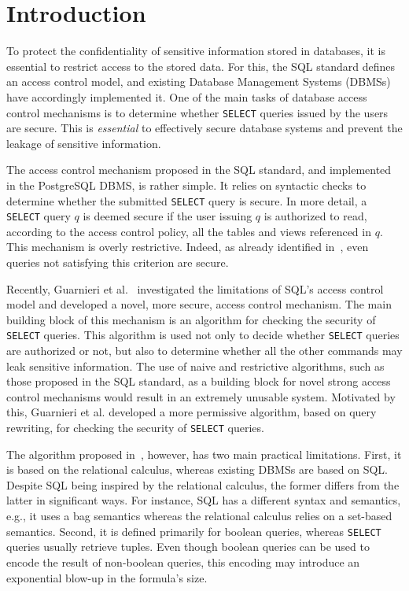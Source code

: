 \section{Introduction}
To protect the confidentiality of sensitive information stored in databases, it is essential to restrict access to the stored data.
%
For this, the SQL standard defines an access control model, and existing Database Management Systems (DBMSs) have accordingly implemented it. 
%
One of the main tasks of database access control mechanisms is to determine whether \texttt{SELECT} queries issued by the users are secure.
%
This is \emph{essential} to effectively secure database systems and prevent the leakage of sensitive information.

The access control mechanism proposed in the SQL standard, and implemented in the PostgreSQL DBMS, is rather simple.
%
It relies on syntactic checks to determine whether the submitted \texttt{SELECT} query is secure.
%
In more detail, a \texttt{SELECT} query $q$ is deemed secure if the user issuing $q$ is authorized to read, according to the access control policy, all the tables and views referenced in $q$. %
%
This mechanism is overly restrictive.
%
Indeed, as already identified in~\cite{guarnieri2014optimal,rizvi2004extending, wang2007correctness,zhang2005authorizations}, even queries not satisfying this criterion are secure.

Recently, Guarnieri et al.~\cite{guarnieri2016strong} investigated the limitations of SQL's access control model and  developed a novel, more secure, access control mechanism.
%
The main building block of this mechanism is an algorithm for checking the security of \texttt{SELECT} queries.
%
This algorithm is used not only to decide whether \texttt{SELECT} queries are authorized or not, but also to determine whether all the other commands may leak sensitive information. 
%
The use of naive and restrictive algorithms, such as those proposed in the SQL standard, as a building block for novel strong access control mechanisms would result in an extremely unusable system.
%
Motivated by this, Guarnieri et al. developed a more permissive algorithm, based on query rewriting, for checking the security of \texttt{SELECT} queries.

The algorithm proposed in~\cite{guarnieri2016strong}, however, has two main practical limitations.
%
First, it is based on the relational calculus, whereas existing DBMSs are based on SQL. Despite SQL being inspired by the relational calculus, the former differs from the latter in significant ways. For instance, SQL has a different syntax and semantics, e.g., it uses a bag semantics whereas the relational calculus relies on a set-based semantics.
%
Second, it is defined primarily for boolean queries, whereas \texttt{SELECT} queries usually retrieve tuples.
%
Even though boolean queries can be used to encode the result of non-boolean queries, this encoding may introduce an exponential blow-up in the formula's size.

